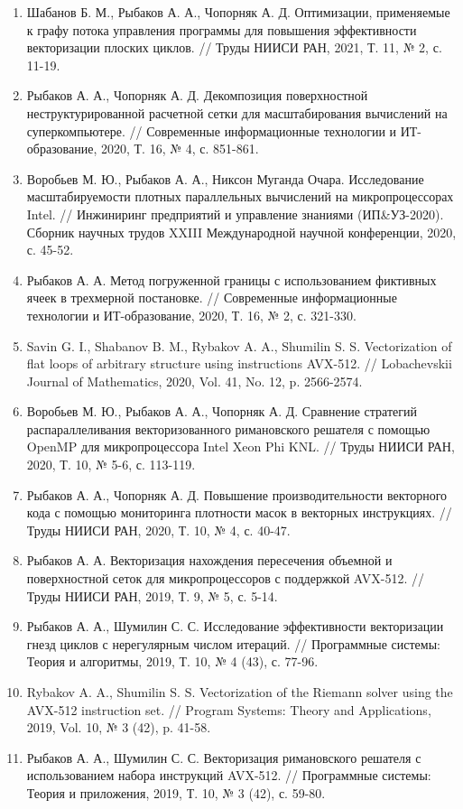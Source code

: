 \documentclass[a4paper,14pt]{extarticle}                     %
\theoremstyle{plain}                                         %
\begin{document}
\begin{enumerate}
\item Шабанов Б. М., Рыбаков А. А., Чопорняк А. Д. Оптимизации, применяемые к графу потока управления программы для повышения эффективности векторизации плоских циклов. // Труды НИИСИ РАН, 2021, Т. 11, № 2, с. 11-19.
\item Рыбаков А. А., Чопорняк А. Д. Декомпозиция поверхностной неструктурированной расчетной сетки для масштабирования вычислений на суперкомпьютере. // Современные информационные технологии и ИТ-образование, 2020, Т. 16, № 4, с. 851-861.
\item Воробьев М. Ю., Рыбаков А. А., Никсон Муганда Очара. Исследование масштабируемости плотных параллельных вычислений на микропроцессорах Intel. // Инжиниринг предприятий и управление знаниями (ИП\&УЗ-2020). Сборник научных трудов XXIII Международной научной конференции, 2020, с. 45-52.
\item Рыбаков А. А. Метод погруженной границы с использованием фиктивных ячеек в трехмерной постановке. // Современные информационные технологии и ИТ-образование, 2020, Т. 16, № 2, с. 321-330.
\item Savin G. I., Shabanov B. M., Rybakov A. A., Shumilin S. S. Vectorization of flat loops of arbitrary structure using instructions AVX-512. // Lobachevskii Journal of Mathematics, 2020, Vol. 41, No. 12, p. 2566-2574.
\item Воробьев М. Ю., Рыбаков А. А., Чопорняк А. Д. Сравнение стратегий распараллеливания векторизованного римановского решателя с помощью OpenMP для микропроцессора Intel Xeon Phi KNL. // Труды НИИСИ РАН, 2020, Т. 10, № 5-6, с. 113-119.
\item Рыбаков А. А., Чопорняк А. Д. Повышение производительности векторного кода с помощью мониторинга плотности масок в векторных инструкциях. // Труды НИИСИ РАН, 2020, Т. 10, № 4, с. 40-47.
\item Рыбаков А. А. Векторизация нахождения пересечения объемной и поверхностной сеток для микропроцессоров с поддержкой AVX-512. // Труды НИИСИ РАН, 2019, Т. 9, № 5, с. 5-14.
\item Рыбаков А. А., Шумилин С. С. Исследование эффективности векторизации гнезд циклов с нерегулярным числом итераций. // Программные системы: Теория и алгоритмы, 2019, Т. 10, № 4 (43), с. 77-96.
\item Rybakov A. A., Shumilin S. S. Vectorization of the Riemann solver using the AVX-512 instruction set. // Program Systems: Theory and Applications, 2019, Vol. 10, № 3 (42), p. 41-58.
\item Рыбаков А. А., Шумилин С. С. Векторизация римановского решателя с использованием набора инструкций AVX-512. // Программные системы: Теория и приложения, 2019, Т. 10, № 3 (42), с. 59-80.

\end{enumerate}
\end{document}
